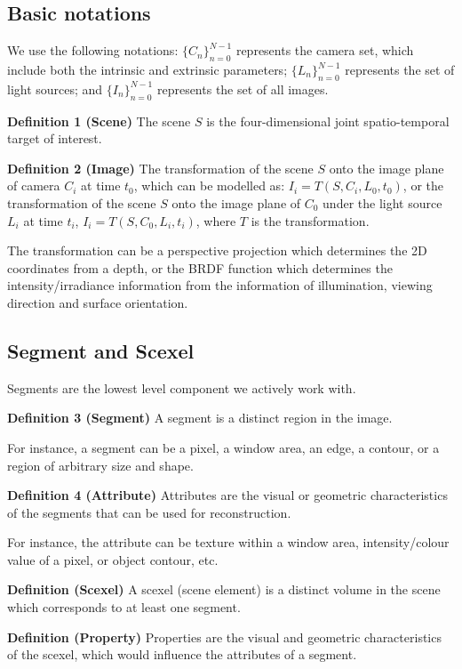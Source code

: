 \subsection{Basic notations}
We use the following notations: $\{C_n\}_{n=0}^{N-1}$ represents the camera set, which include both the intrinsic and extrinsic parameters; $\{L_n\}_{n=0}^{N-1}$ represents the set of light sources; and $\{I_n\}_{n=0}^{N-1}$ represents the set of all images.

\textbf{Definition 1 (Scene)} The scene $S$ is the four-dimensional joint spatio-temporal target of interest.

\textbf{Definition 2 (Image)} The transformation of the scene $S$ onto the image plane of camera $C_i$ at time $t_0$, which can be modelled as: $I_i = T(S, C_i, L_0, t_0)$, or the transformation of the scene $S$ onto the image plane of $C_0$  under the light source $L_i$ at time $t_i$, $I_i= T(S, C_0, L_i, t_i)$, where $T$ is the transformation.

The transformation can be a perspective projection which determines the 2D coordinates from a depth, or the BRDF function which determines the intensity/irradiance information from the information of illumination, viewing direction and surface orientation.

\subsection{Segment and Scexel}
Segments are the lowest level component we actively work with.

\textbf{Definition 3 (Segment)} A segment is a distinct region in the image.

For instance, a segment can be a pixel, a window area, an edge, a contour, or a region of arbitrary size and shape.

\textbf{Definition 4 (Attribute)} Attributes are the visual or geometric characteristics of the segments that can be used for reconstruction.

For instance, the attribute can be texture within a window area, intensity/colour value of a pixel, or object contour, etc.

\textbf{Definition (Scexel)} A scexel (scene element) is a distinct volume in the scene which corresponds to at least one segment.

\textbf{Definition (Property)} Properties are the visual and geometric characteristics of the scexel, which would influence the attributes of a segment.

